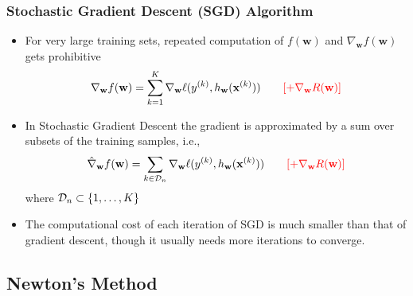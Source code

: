 \documentclass{beamer}
\newcommand{\xM}{{\mathbf x}}
\newcommand{\w}{{\mathbf w}}
\begin{document}
\begin{frame}

	\frametitle{Stochastic Gradient Descent (SGD) Algorithm}

\begin{itemize}
\item For very large training sets, repeated computation of $f(\w)$ and $\nabla_\w f(\w)$ gets prohibitive
$$\nabla_\w f(\w) = \sum_{k=1}^K \nabla_\w \ell(y^{(k)}, h_\w(\xM^{(k)})) ~~~~~~ \color{red}{[+\nabla_\w R(\w)]}$$

\item In Stochastic Gradient Descent the gradient is approximated by a sum over subsets of the training samples, i.e.,
$$\hat \nabla_\w f(\w) = \sum_{k \in {\cal D}_n} \nabla_\w \ell(y^{(k)}, h_\w(\xM^{(k)})) ~~~~~~ \color{red}{[+\nabla_\w R(\w)]}$$
where ${\cal D}_n \subset \left\{1,\dots,K \right\}$

\item The computational cost of each iteration of SGD is much smaller than that of gradient descent, though it usually needs more iterations to converge.
\end{itemize}


\end{frame}

\subsection{Newton's Method}
\end{document}
